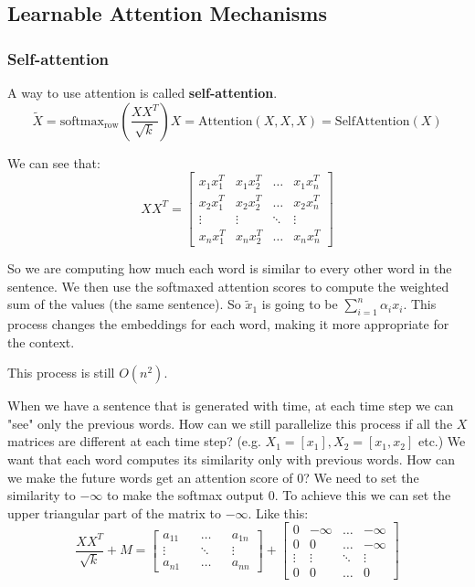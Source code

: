 \subsection{Learnable Attention Mechanisms}
\label{sec:learnable-attention-mechanisms}

\subsubsection{Self-attention}

A way to use attention is called \textbf{self-attention}.
\[
    \tilde{X}=\text{softmax}_\text{row}(\frac{XX^T}{\sqrt{k}})X=\text{Attention}(X,X,X)=\text{SelfAttention}(X)
\]

We can see that:
\[
    XX^T=\begin{bmatrix}
    x_1x_1^T & x_1x_2^T & \ldots & x_1x_n^T\\
    x_2x_1^T & x_2x_2^T & \ldots & x_2x_n^T\\
    \vdots & \vdots & \ddots & \vdots\\
    x_nx_1^T & x_nx_2^T & \ldots & x_nx_n^T
    \end{bmatrix}
\]

So we are computing how much each word is similar to
every other word in the sentence.
We then use the softmaxed attention scores to compute the
weighted sum of the values (the same sentence).
So $\tilde{x}_1$ is going to be $\sum_{i=1}^{n}\alpha_ix_i$.
This process changes the embeddings for each word,
making it more appropriate for the context.

This process is still $O(n^2)$.

When we have a sentence that is generated with time,
at each time step we can "see" only the previous words.
How can we still parallelize this process if all the $X$ matrices
are different at each time step? (e.g. $X_1=[x_1], X_2=[x_1, x_2]$ etc.)
We want that each word computes its similarity only with 
previous words. How can we make the future words get an
attention score of $0$? We need to set the similarity to
$-\infty$ to make the softmax output $0$. To achieve this
we can set the upper triangular part of the matrix to $-\infty$.
Like this:
\[
    \frac{XX^T}{\sqrt{k}}+M=\begin{bmatrix}
        a_{11} && \ldots && a_{1n}\\
        \vdots && \ddots && \vdots\\
        a_{n1} && \ldots && a_{nn}
    \end{bmatrix} + \begin{bmatrix}
        0 & -\infty & \ldots & -\infty\\
        0 & 0 & \ldots & -\infty\\
        \vdots & \vdots & \ddots & \vdots\\
        0 & 0 & \ldots & 0
    \end{bmatrix}
\]

